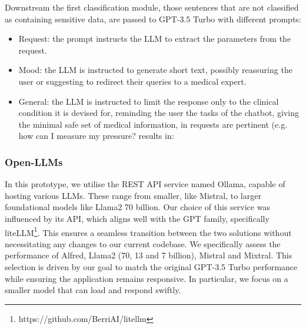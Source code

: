 Downstream the first classification module, those sentences that are not classified as containing sensitive data, are passed to GPT-3.5 Turbo with different prompts: 
\begin{itemize}
    \item Request: the prompt instructs the LLM to extract the parameters from the request.
    \item Mood: the LLM is instructed to generate short text, possibly reassuring the user or suggesting to redirect their queries to a medical expert.
    \item General: the LLM is instructed to limit the response only to the clinical condition it is devised for, reminding the user the tasks of the chatbot, giving the minimal safe set of medical information, in requests are pertinent (e.g. how can I measure my pressure? results in:  
\end{itemize}

\subsubsection{Open-LLMs}
In this prototype, we utilise the REST API service named Ollama, capable of hosting various LLMs.
%
These range from smaller, like Mistral, to larger foundational models like Llama2 70 billion.
%
Our choice of this service was influenced by its API, which aligns well with the GPT family, specifically liteLLM\footnote{https://github.com/BerriAI/litellm}. This ensures a seamless transition between the two solutions without necessitating any changes to our current codebase.
%
We specifically assess the performance of Alfred, Llama2 (70, 13 and 7 billion), Mistral and Mixtral.
%
This selection is driven by our goal to match the original GPT-3.5 Turbo performance while ensuring the application remains responsive. 
%
In particular, we focus on a smaller model that can load and respond swiftly.

